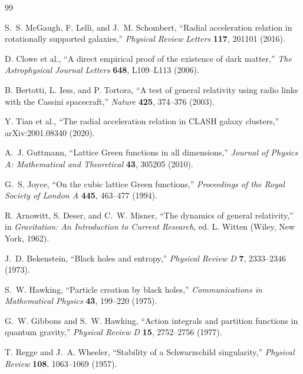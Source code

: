 \documentclass[11pt]{article}
\begin{document}
\begin{thebibliography}{99}

S.~S. McGaugh, F. Lelli, and J.~M. Schombert,
``Radial acceleration relation in rotationally supported galaxies,''
\emph{Physical Review Letters} \textbf{117}, 201101 (2016).

D. Clowe et al.,
``A direct empirical proof of the existence of dark matter,''
\emph{The Astrophysical Journal Letters} \textbf{648}, L109--L113 (2006).

B. Bertotti, L. Iess, and P. Tortora,
``A test of general relativity using radio links with the Cassini spacecraft,''
\emph{Nature} \textbf{425}, 374--376 (2003).

Y. Tian et al.,
``The radial acceleration relation in CLASH galaxy clusters,''
arXiv:2001.08340 (2020).

A.~J. Guttmann,
``Lattice Green functions in all dimensions,''
\emph{Journal of Physics A: Mathematical and Theoretical} \textbf{43}, 305205 (2010).

G.~S. Joyce,
``On the cubic lattice Green functions,''
\emph{Proceedings of the Royal Society of London A} \textbf{445}, 463--477 (1994).

R. Arnowitt, S. Deser, and C.~W. Misner,
``The dynamics of general relativity,''
in \emph{Gravitation: An Introduction to Current Research},
ed. L. Witten (Wiley, New York, 1962).

J.~D. Bekenstein,
``Black holes and entropy,''
\emph{Physical Review D} \textbf{7}, 2333--2346 (1973).

S.~W. Hawking,
``Particle creation by black holes,''
\emph{Communications in Mathematical Physics} \textbf{43}, 199--220 (1975).

G.~W. Gibbons and S.~W. Hawking,
``Action integrals and partition functions in quantum gravity,''
\emph{Physical Review D} \textbf{15}, 2752--2756 (1977).

T. Regge and J.~A. Wheeler,
``Stability of a Schwarzschild singularity,''
\emph{Physical Review} \textbf{108}, 1063--1069 (1957).


\end{thebibliography}
\end{document}
